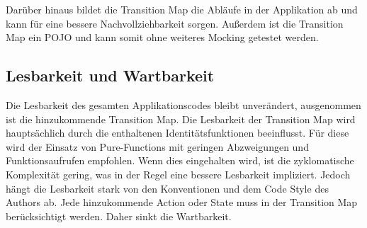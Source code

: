 Darüber hinaus bildet die Transition Map die Abläufe in der Applikation ab und kann für eine bessere Nachvollziehbarkeit sorgen. Außerdem ist die Transition Map ein POJO und kann somit ohne weiteres Mocking getestet werden.

\subsection{Lesbarkeit und Wartbarkeit}
Die Lesbarkeit des gesamten Applikationscodes bleibt unverändert, ausgenommen ist die hinzukommende Transition Map. Die Lesbarkeit der Transition Map wird hauptsächlich durch die enthaltenen Identitätsfunktionen beeinflusst. Für diese wird der Einsatz von Pure-Functions mit geringen Abzweigungen und Funktionsaufrufen empfohlen. Wenn dies eingehalten wird, ist die zyklomatische Komplexität gering, was in der Regel eine bessere Lesbarkeit impliziert. Jedoch hängt die Lesbarkeit stark von den Konventionen und dem Code Style des Authors ab. Jede hinzukommende Action oder State muss in der Transition Map berücksichtigt werden. Daher sinkt die Wartbarkeit.

